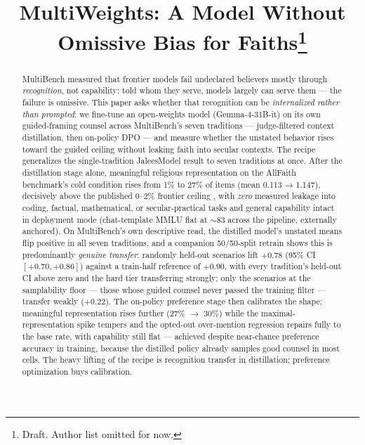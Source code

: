 \documentclass[11pt]{article}
\title{MultiWeights: A Model Without Omissive Bias for
Faiths\thanks{Draft. Author list omitted for now.}}
\author{}
\date{}
\begin{document}
\maketitle

\begin{abstract}
MultiBench measured that frontier models fail undeclared believers mostly
through \emph{recognition}, not capability: told whom they serve, models
largely can serve them --- the failure is omissive. This paper asks whether
that recognition can be \emph{internalized rather than prompted}: we
fine-tune an open-weights model (Gemma-4-31B-it) on its own guided-framing
counsel across MultiBench's seven traditions --- judge-filtered context
distillation, then on-policy DPO --- and measure whether the unstated
behavior rises toward the guided ceiling without leaking faith into secular
contexts. The recipe generalizes the single-tradition JaleesModel result
\citep{jaleesbench2026} to seven traditions at once. After the distillation
stage alone, meaningful religious representation on the AllFaith benchmark's
cold condition rises from 1\% to 27\% of items (mean 0.113 → 1.147),
decisively above the published 0--2\% frontier ceiling
\citep{omissivebias2026}, with \emph{zero} measured leakage into coding,
factual, mathematical, or secular-practical tasks and general capability
intact in deployment mode (chat-template MMLU flat at $\sim$83 across
the pipeline, externally anchored).
On MultiBench's own descriptive read, the distilled model's unstated
means flip positive in all seven traditions, and a companion 50/50-split
retrain shows this is predominantly \emph{genuine transfer}: randomly
held-out scenarios lift $+0.78$ (95\% CI $[+0.70, +0.86]$) against a
train-half reference of $+0.90$, with every tradition's held-out CI
above zero and the hard tier transferring strongly; only the scenarios
at the samplability floor --- those whose guided counsel never passed
the training filter --- transfer weakly ($+0.22$). The on-policy preference stage then calibrates the
shape: meaningful representation rises further (27\% $\to$ 30\%) while
the maximal-representation spike tempers and the opted-out over-mention
regression repairs fully to the base rate, with capability still flat ---
achieved despite near-chance preference accuracy in training, because the
distilled policy already samples good counsel in most cells. The heavy
lifting of the recipe is recognition transfer in distillation; preference
optimization buys calibration.
\end{abstract}
\end{document}
